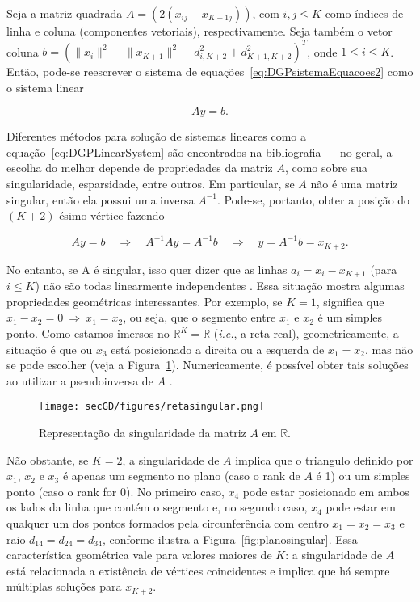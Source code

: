 Seja a matriz quadrada $A = (2(x_{ij} - x_{K+1j}))$, com $i,j \leq K$ como índices de linha e coluna (componentes vetoriais), respectivamente. Seja também o vetor coluna $b = (\lVert x_i\rVert^2 - \lVert x_{K+1}\rVert^2 - d^2_{i,K+2} + d^2_{K+1,K+2})^T$, onde $1 \leq i\leq K$. Então, pode-se reescrever o sistema de equações~\ref{eq:DGPsistemaEquacoes2} como o sistema linear

\begin{equation}
	Ay=b.
	\label{eq:DGPLinearSystem}
\end{equation}

Diferentes métodos para solução de sistemas lineares como a equação~\ref{eq:DGPLinearSystem} são encontrados na bibliografia \cite{AlgebraLinearElon} --- no geral, a escolha do melhor depende de propriedades da matriz $A$, como sobre sua singularidade, esparsidade, entre outros. Em particular, se $A$ não é uma matriz singular, então ela possui uma inversa $A^{-1}$. Pode-se, portanto, obter a posição do $(K+2)$-ésimo vértice fazendo

\begin{equation}
	Ay = b \quad \Rightarrow \quad A^{-1}Ay = A^{-1}b \quad \Rightarrow \quad y = A^{-1}b = x_{K+2}.
\end{equation}

No entanto, se A é singular, isso quer dizer que as linhas $a_i = x_i - x_{K+1}$ (para $i\leq K$) não são todas linearmente independentes \cite{AlgebraLinearElon}. Essa situação mostra algumas propriedades geométricas interessantes. Por exemplo, se $K=1$, significa que $x_1 - x_2 = 0 \ \Rightarrow \  x_1 = x_2$, ou seja, que o segmento entre $x_1$ e $x_2$ é um simples ponto. Como estamos imersos no $\mathbb{R}^{K} = \mathbb{R}$ (\textit{i.e.}, a reta real), geometricamente, a situação é que ou $x_3$ está posicionado a direita ou a esquerda de $x_1 = x_2$, mas não se pode escolher (veja a Figura~\ref{fig:retasingular}). Numericamente, é possível obter tais soluções ao utilizar a pseudoinversa de $A$ \cite{linearAlgebraNumericalTrefethen}.

\begin{figure}[H]
	\begin{center}
		\texttt{[image: secGD/figures/retasingular.png]}
	\end{center}
	\caption{Representação da singularidade da matriz $A$ em $\mathbb{R}$.}
	\label{fig:retasingular}
\end{figure}

Não obstante, se $K = 2$, a singularidade de $A$ implica que o triangulo definido por $x_1$, $x_2$ e $x_3$ é apenas um segmento no plano (caso o rank de $A$ é 1) ou um simples ponto (caso o rank for 0). No primeiro caso, $x_4$ pode estar posicionado em ambos os lados da linha que contém o segmento e, no segundo caso, $x_4$ pode estar em qualquer um dos pontos formados pela circunferência com centro $x_1 = x_2 = x_3$ e raio $d_{14} = d_{24} = d_{34}$, conforme ilustra a Figura~\ref{fig:planosingular}. 
Essa característica geométrica vale para valores maiores de $K$: a singularidade de $A$ está relacionada a existência de vértices coincidentes e implica que há sempre múltiplas soluções para $x_{K+2}$.

